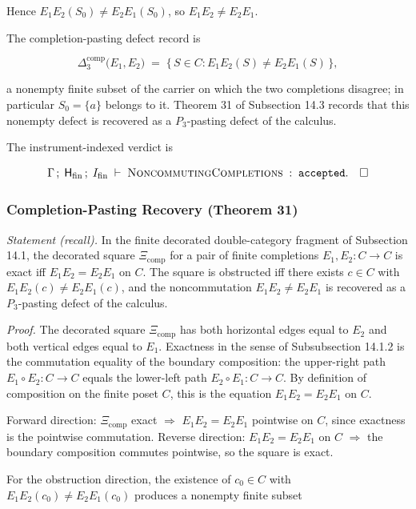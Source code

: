 \documentclass[11pt]{article}
\theoremstyle{definition}
\begin{document}
Hence \(E_1E_2(S_0)\neq E_2E_1(S_0)\), so \(E_1E_2\neq E_2E_1\).

The completion-pasting defect record is

\[
\Delta_3^{\mathrm{comp}}\bigl(E_{1},E_{2}\bigr)\;=\;\{\,S\in C:E_1E_2(S)\neq E_2E_1(S)\,\},
\]

a nonempty finite subset of the carrier on which the two completions disagree; in particular \(S_0=\{a\}\) belongs to it. Theorem 31 of Subsection 14.3 records that this nonempty defect is recovered as a \(P_{3}\)-pasting defect of the calculus.

The instrument-indexed verdict is

\[
\Gamma\,;\;\mathsf H_{\mathrm{fin}}\,;\;I_{\mathrm{fin}}\;\vdash\;\textsc{NoncommutingCompletions}\;:\;\texttt{accepted}.\quad\square
\]

\subsubsection{Completion-Pasting Recovery (Theorem 31)}

\emph{Statement (recall).} In the finite decorated double-category fragment of Subsection 14.1, the decorated square \(\Xi_{\mathrm{comp}}\) for a pair of finite completions \(E_{1},E_{2}:C\to C\) is exact iff \(E_{1}E_{2}=E_{2}E_{1}\) on \(C\). The square is obstructed iff there exists \(c\in C\) with \(E_{1}E_{2}(c)\neq E_{2}E_{1}(c)\), and the noncommutation \(E_{1}E_{2}\neq E_{2}E_{1}\) is recovered as a \(P_{3}\)-pasting defect of the calculus.

\emph{Proof.} The decorated square \(\Xi_{\mathrm{comp}}\) has both horizontal edges equal to \(E_{2}\) and both vertical edges equal to \(E_{1}\). Exactness in the sense of Subsubsection 14.1.2 is the commutation equality of the boundary composition: the upper-right path \(E_{1}\circ E_{2}:C\to C\) equals the lower-left path \(E_{2}\circ E_{1}:C\to C\). By definition of composition on the finite poset \(C\), this is the equation \(E_{1}E_{2}=E_{2}E_{1}\) on \(C\).

Forward direction: \(\Xi_{\mathrm{comp}}\) exact \(\Rightarrow\) \(E_{1}E_{2}=E_{2}E_{1}\) pointwise on \(C\), since exactness is the pointwise commutation. Reverse direction: \(E_{1}E_{2}=E_{2}E_{1}\) on \(C\) \(\Rightarrow\) the boundary composition commutes pointwise, so the square is exact.

For the obstruction direction, the existence of \(c_{0}\in C\) with \(E_{1}E_{2}(c_{0})\neq E_{2}E_{1}(c_{0})\) produces a nonempty finite subset
\end{document}
